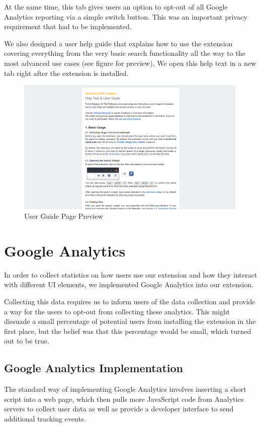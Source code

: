\documentclass[bsc,frontabs,twoside,singlespacing,parskip,deptreport]{infthesis}
\begin{document}
At the same time, this tab gives users an option to opt-out of all Google Analytics reporting via a simple switch button. This was an important privacy requirement that had to be implemented.

We also designed a user help guide that explains how to use the extension covering everything from the very basic search functionality all the way to the most advanced use cases (see figure for preview). We open this help text in a new tab right after the extension is installed.

\begin{figure}[h]
\centering
\includegraphics[width=0.99\textwidth]{../docs/help-text-screenshot.png}
\caption{User Guide Page Preview}
\end{figure}


\section{Google Analytics}
In order to collect statistics on how users use our extension and how they interact with different UI elements, we implemented Google Analytics into our extension.

Collecting this data requires us to inform users of the data collection and provide a way for the users to opt-out from collecting these analytics. This might dissuade a small percentage of potential users from installing the extension in the first place, but the belief was that this percentage would be small, which turned out to be true.

\subsection{Google Analytics Implementation}
The standard way of implementing Google Analytics involves inserting a short script into a web page, which then pulls more JavaScript code from Analytics servers to collect user data as well as provide a developer interface to send additional tracking events.
\end{document}
